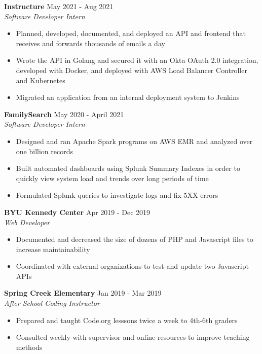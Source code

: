\documentclass[letterpaper]{article}
\begin{document}
\textbf{Instructure} \hfill May 2021 - Aug 2021\\
\textit{Software Developer Intern}\\
\vspace{-1mm}
\begin{itemize} \itemsep 1pt
	\item Planned, developed, documented, and deployed an API and frontend that receives and forwards thousands of emails a day
	\item Wrote the API in Golang and secured it with an Okta OAuth 2.0 integration, developed with Docker, and deployed with AWS Load Balancer Controller and Kubernetes
	\item Migrated an application from an internal deployment system to Jenkins
\end{itemize}
\textbf{FamilySearch} \hfill May 2020 - April 2021\\
\textit{Software Developer Intern}\\
\vspace{-1mm}
\begin{itemize} \itemsep 1pt
	\item Designed and ran Apache Spark programs on AWS EMR and analyzed over one billion records
	\item Built automated dashboards using Splunk Summary Indexes in order to quickly view system load and trends over long periods of time
	\item Formulated Splunk queries to investigate logs and fix 5XX errors
    
\end{itemize}
\textbf{BYU Kennedy Center} \hfill Apr 2019 - Dec 2019\\
\textit{Web Developer}\\
\vspace{-1mm}
\begin{itemize} \itemsep 1pt
	\item Documented and decreased the size of dozens of PHP and Javascript files to increase maintainability
	\item Coordinated with external organizations to test and update two Javascript APIs
\end{itemize}
\textbf{Spring Creek Elementary} \hfill Jan 2019 - Mar 2019\\
\textit{After School Coding Instructor}\\
\vspace{-1mm}
\begin{itemize} \itemsep 1pt
	\item Prepared and taught Code.org lesssons twice a week to 4th-6th graders
	\item Consulted weekly with supervisor and online resources to improve teaching methods
\end{itemize}
\end{document}
